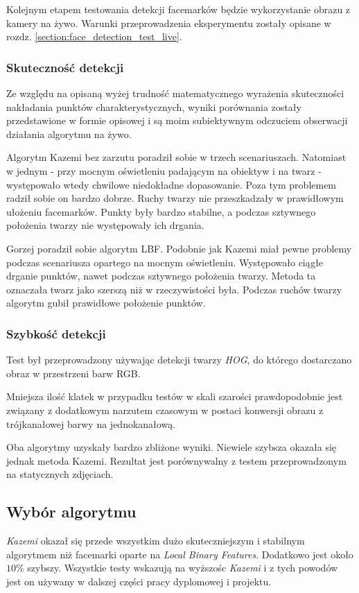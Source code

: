 Kolejnym etapem testowania detekcji facemarków będzie wykorzystanie obrazu z kamery na żywo. Warunki przeprowadzenia eksperymentu zostały opisane w rozdz. \hyperref[{section:face_detection_test_live}]{\ref{section:face_detection_test_live}}.

\subsubsection{Skuteczność detekcji}

Ze względu na opisaną wyżej trudność matematycznego wyrażenia skuteczności nakładania punktów charakterystycznych, wyniki porównania zostały przedstawione w formie opisowej i są moim subiektywnym odczuciem obserwacji działania algorytmu na żywo.

\vspace{5mm}

Algorytm Kazemi bez zarzutu poradził sobie w trzech scenariuszach. Natomiast w jednym - przy mocnym oświetleniu padającym na obiektyw i na twarz - występowało wtedy chwilowe niedokładne dopasowanie. Poza tym problemem radził sobie on bardzo dobrze. Ruchy twarzy nie przeszkadzały w prawidłowym ułożeniu facemarków. Punkty były bardzo stabilne, a podczas sztywnego położenia twarzy nie występowały ich drgania.
\par
Gorzej poradził sobie algorytm LBF. Podobnie jak Kazemi miał pewne problemy podczas scenariusza opartego na mocnym oświetleniu. Występowało ciągłe drganie punktów, nawet podczas sztywnego położenia twarzy. Metoda ta oznaczała twarz jako szerszą niż w rzeczywistości była. Podczas ruchów twarzy algorytm gubił prawidłowe położenie punktów.

\subsubsection{Szybkość detekcji} \label{section:facemark_speed_live}

Test był przeprowadzony używając detekcji twarzy \textit{HOG}, do którego dostarczano obraz w przestrzeni barw RGB. 



Mniejsza ilość klatek w przypadku testów w skali szarości prawdopodobnie jest związany z dodatkowym narzutem czasowym w postaci konwersji obrazu z trójkanałowej barwy na jednokanałową.
\par
Oba algorytmy uzyskały bardzo zbliżone wyniki. Niewiele szybsza okazała się jednak metoda Kazemi. Rezultat jest porównywalny z testem przeprowadzonym na statycznych zdjęciach.

\subsection{Wybór algorytmu}

\textit{Kazemi} okazał się przede wszystkim dużo skuteczniejszym i stabilnym algorytmem niż facemarki oparte na \textit{Local Binary Features}. Dodatkowo jest około $10\%$ szybszy. Wszystkie testy wskazują na wyższośc \textit{Kazemi} i z tych powodów jest on używany w dalszej części pracy dyplomowej i projektu. 